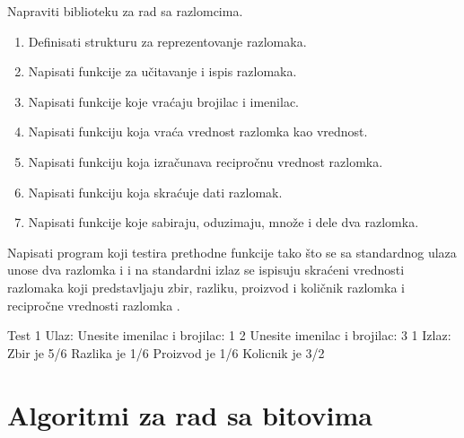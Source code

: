 \begin{Exercise}[label=004] %
Napraviti biblioteku za rad sa razlomcima.

  \begin{enumerate}

  \item Definisati strukturu za reprezentovanje razlomaka.

  \item Napisati funkcije za učitavanje i ispis razlomaka.

  \item Napisati funkcije koje vraćaju brojilac i imenilac.

  \item Napisati funkciju koja vraća vrednost razlomka kao  
    vrednost.

  \item Napisati funkciju koja izračunava recipročnu vrednost
    razlomka.

  \item Napisati funkciju koja skraćuje dati razlomak.

  \item Napisati funkcije koje sabiraju, oduzimaju, množe i dele
    dva razlomka.

  \end{enumerate}

Napisati program koji testira prethodne funkcije tako što se sa standardnog ulaza unose dva razlomka  i  i na standardni izlaz se ispisuju skraćeni vrednosti razlomaka koji predstavljaju zbir, razliku, proizvod i količnik razlomka  i recipročne vrednosti razlomka .

\begin{maxitest}
\begin{test}{Test 1}
Ulaz:   Unesite imenilac i brojilac: 1 2
          Unesite imenilac i brojilac: 3 1 
Izlaz:   Zbir je 5/6
           Razlika je 1/6
           Proizvod je 1/6
           Kolicnik je 3/2
\end{test}
\end{maxitest}


\end{Exercise}

\section{Algoritmi za rad sa bitovima}

